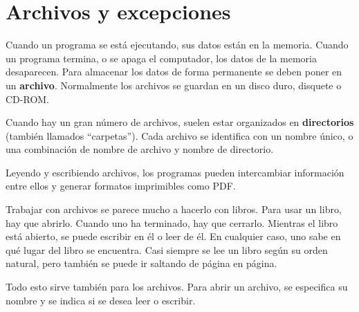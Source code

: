 


\chapter{Archivos y excepciones}

Cuando un programa se está ejecutando, sus datos están en la memoria. Cuando
un programa termina, o se apaga el computador, los datos de la memoria
desaparecen. Para almacenar los datos de forma permanente se deben poner
en un {\bf archivo}. Normalmente los archivos se guardan en un disco duro,
disquete o CD-ROM.

Cuando hay un gran número de archivos, suelen estar organizados en
{\bf directorios} (también llamados ``carpetas''). Cada archivo se
identifica con un nombre único, o una combinación de nombre de archivo
y nombre de directorio.

Leyendo y escribiendo archivos, los programas pueden intercambiar
información entre ellos y generar formatos imprimibles como PDF.

Trabajar con archivos se parece mucho a hacerlo con libros. Para usar
un libro, hay que abrirlo. Cuando uno ha terminado, hay que cerrarlo.
Mientras el libro está abierto, se puede escribir en él o leer de él.
En cualquier caso, uno sabe en qué lugar del libro se encuentra. Casi
siempre se lee un libro según su orden natural, pero  también se
puede ir saltando de página en página.

Todo esto sirve también para los archivos. Para abrir un archivo,
se especifica su nombre y se indica si se desea leer o escribir.

